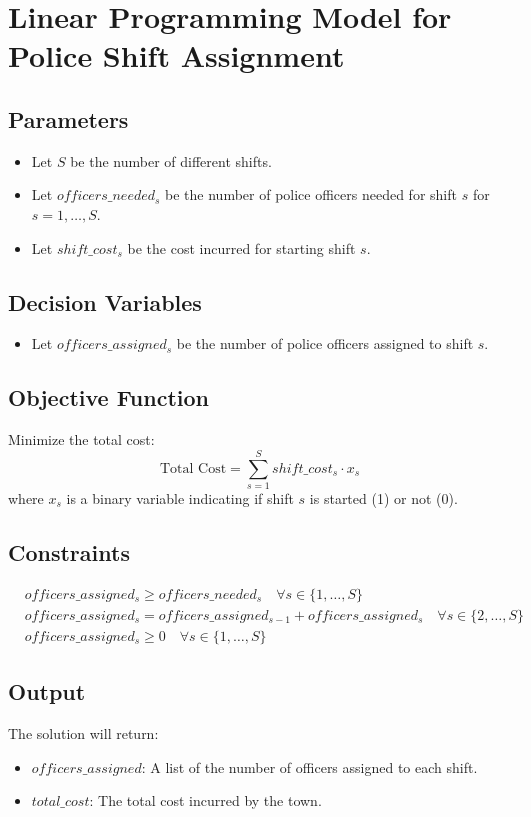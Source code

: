 \documentclass{article}
\begin{document}
\section*{Linear Programming Model for Police Shift Assignment}

\subsection*{Parameters}
\begin{itemize}
    \item Let \( S \) be the number of different shifts.
    \item Let \( officers\_needed_s \) be the number of police officers needed for shift \( s \) for \( s = 1, \ldots, S \).
    \item Let \( shift\_cost_s \) be the cost incurred for starting shift \( s \).
\end{itemize}

\subsection*{Decision Variables}
\begin{itemize}
    \item Let \( officers\_assigned_s \) be the number of police officers assigned to shift \( s \).
\end{itemize}

\subsection*{Objective Function}
Minimize the total cost:
\[
\text{Total Cost} = \sum_{s=1}^{S} shift\_cost_s \cdot x_s
\]
where \( x_s \) is a binary variable indicating if shift \( s \) is started (1) or not (0).

\subsection*{Constraints}
\begin{align}
    & officers\_assigned_s \geq officers\_needed_s \quad \forall s \in \{1, \ldots, S\} \\
    & officers\_assigned_s = officers\_assigned_{s-1} + officers\_assigned_s \quad \forall s \in \{2, \ldots, S\} \\
    & officers\_assigned_s \geq 0 \quad \forall s \in \{1, \ldots, S\}
\end{align}

\subsection*{Output}
The solution will return:
\begin{itemize}
    \item \( officers\_assigned \): A list of the number of officers assigned to each shift.
    \item \( total\_cost \): The total cost incurred by the town.
\end{itemize}
\end{document}
